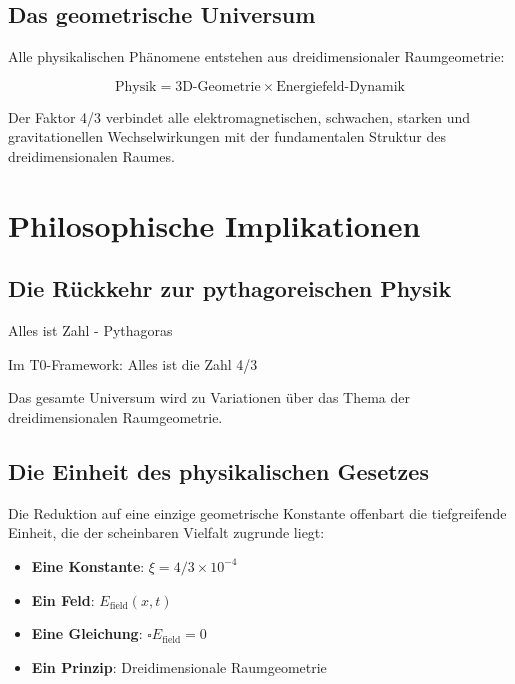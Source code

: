 \documentclass[12pt,a4paper]{report}
\begin{document}
	\subsection{Das geometrische Universum}
	\label{subsec:geometric_universe}
	
	Alle physikalischen Phänomene entstehen aus dreidimensionaler Raumgeometrie:
	
	\begin{equation}
		\text{Physik} = \text{3D-Geometrie} \times \text{Energiefeld-Dynamik}
	\end{equation}
	
	Der Faktor 4/3 verbindet alle elektromagnetischen, schwachen, starken und gravitationellen Wechselwirkungen mit der fundamentalen Struktur des dreidimensionalen Raumes.
	
	\section{Philosophische Implikationen}
	\label{sec:philosophical_implications}
	
	\subsection{Die Rückkehr zur pythagoreischen Physik}
	\label{subsec:pythagorean_physics}
	
	\begin{tcolorbox}[colback=blue!5!white,colframe=blue!75!black,title=Pythagoreische Einsicht]
		Alles ist Zahl - Pythagoras
		
		Im T0-Framework: Alles ist die Zahl 4/3
		
		Das gesamte Universum wird zu Variationen über das Thema der dreidimensionalen Raumgeometrie.
	\end{tcolorbox}
	
	\subsection{Die Einheit des physikalischen Gesetzes}
	\label{subsec:unity_physical_law}
	
	Die Reduktion auf eine einzige geometrische Konstante offenbart die tiefgreifende Einheit, die der scheinbaren Vielfalt zugrunde liegt:
	
	\begin{itemize}
		\item \textbf{Eine Konstante}: $\xi = 4/3 \times 10^{-4}$
		\item \textbf{Ein Feld}: $E_{\text{field}}(x,t)$
		\item \textbf{Eine Gleichung}: $\square E_{\text{field}} = 0$
		\item \textbf{Ein Prinzip}: Dreidimensionale Raumgeometrie
	\end{itemize}
	
\end{document}
